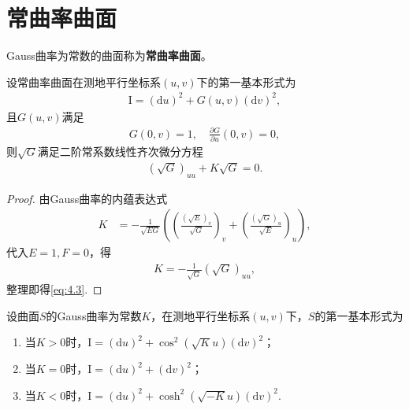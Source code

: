 \documentclass[../../main.tex]{subfiles}%
\begin{document}
\section{常曲率曲面}

\begin{definition}
Gauss曲率为常数的曲面称为\textbf{常曲率曲面}。
\end{definition}

\begin{proposition}
设常曲率曲面在测地平行坐标系$(u,v)$下的第一基本形式为
\begin{align}
\mathrm{I}=(\mathrm{d}u)^2+G(u,v)(\mathrm{d}v)^2,\label{eq:4.1}
\end{align}
且$G(u,v)$满足
\begin{align}
G(0,v)=1,\quad \frac{\partial G}{\partial u}(0,v)=0,\label{eq:4.2}
\end{align}
则$\sqrt{G}$满足二阶常系数线性齐次微分方程
\begin{align}
(\sqrt{G})_{uu}+K\sqrt{G}=0.\label{eq:4.3}
\end{align}
\end{proposition}

\begin{proof}

由Gauss曲率的内蕴表达式
\begin{align*}
K&=-\frac{1}{\sqrt{EG}}\left(\left(\frac{(\sqrt{E})_v}{\sqrt{G}}\right)_v+\left(\frac{(\sqrt{G})_u}{\sqrt{E}}\right)_u\right),
\end{align*}
代入$E=1,F=0$，得
\begin{align*}
K=-\frac{1}{\sqrt{G}}(\sqrt{G})_{uu},
\end{align*}
整理即得\eqref{eq:4.3}.

\end{proof}

\begin{theorem}
设曲面$S$的Gauss曲率为常数$K$，在测地平行坐标系$(u,v)$下，$S$的第一基本形式为
\begin{enumerate}[(1)]
\item 当$K>0$时，$\mathrm{I}=(\mathrm{d}u)^2+\cos^2(\sqrt{K}u)(\mathrm{d}v)^2$；
\item 当$K=0$时，$\mathrm{I}=(\mathrm{d}u)^2+(\mathrm{d}v)^2$；
\item 当$K<0$时，$\mathrm{I}=(\mathrm{d}u)^2+\cosh^2(\sqrt{-K}u)(\mathrm{d}v)^2$.
\end{enumerate}
\end{theorem}
\end{document}
